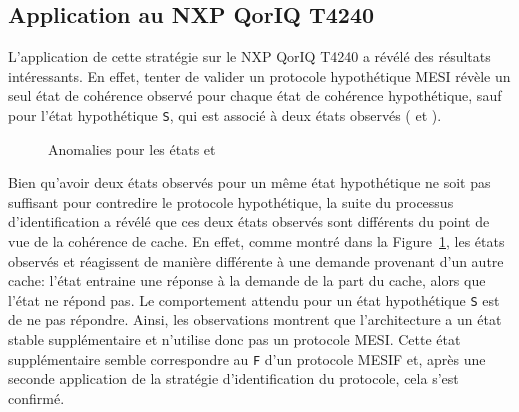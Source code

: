 \subsection{Application au NXP QorIQ T4240}
L'application de cette stratégie sur le NXP QorIQ T4240 a révélé des résultats
intéressants. En effet, tenter de valider un protocole hypothétique MESI révèle
un seul état de cohérence observé pour chaque état de cohérence hypothétique,
sauf pour l'état hypothétique \texttt{S}, qui est associé à deux états observés
(\benchs{} et \benchx{}).

\begin{figure}[hbt!]
\begin{center}

\end{center}
\caption{Anomalies pour les états \benchs{} et \benchx{}}
\label{fr:fig:unexpected_behaviors}
\end{figure}

Bien qu'avoir deux états observés pour un même état hypothétique ne soit pas
suffisant pour contredire le protocole hypothétique, la suite du processus
d'identification a révélé que ces deux états observés sont différents du point
de vue de la cohérence de cache. En effet, comme montré dans la
Figure~\ref{fr:fig:unexpected_behaviors}, les états observés \benchs{} et
\benchx{} réagissent de manière différente à une demande provenant d'un autre
cache: l'état \benchs{} entraine une réponse à la demande de la part du cache,
alors que l'état \benchx{} ne répond pas. Le comportement attendu pour un état
hypothétique \texttt{S} est de ne pas répondre. Ainsi, les observations montrent
que l'architecture a un état stable supplémentaire et n'utilise donc pas un
protocole MESI. Cette état supplémentaire semble correspondre au \texttt{F} d'un
protocole MESIF et, après une seconde application de la stratégie
d'identification du protocole, cela s'est confirmé.
